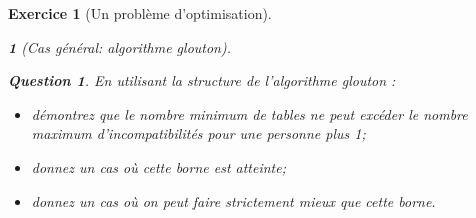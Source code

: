 \documentclass{article}
\theoremstyle{exostyle}
\newtheorem{exo}{Exercice}
\theoremstyle{partiestyle}
\newtheorem{partie}{}[exo]
\theoremstyle{questionstyle}
\newtheorem{questionpartie}{Question}[partie]
\begin{document}
\begin{exo}[Un problème d'optimisation]
\begin{partie}[Cas général: algorithme glouton]
\begin{questionpartie}
En utilisant la structure de l'algorithme glouton :
\begin{itemize}
\item démontrez que le nombre minimum de tables ne peut excéder le nombre maximum d'incompatibilités pour une personne plus 1;
\item donnez un cas où cette borne est atteinte;
\item donnez un cas où on peut faire strictement mieux que cette borne.
\end{itemize}
\end{questionpartie}

\end{partie}

\end{exo}
\end{document}
